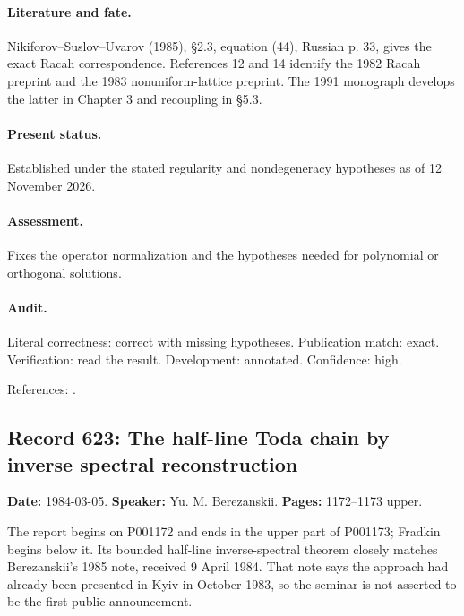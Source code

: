 \paragraph{Literature and fate.} Nikiforov–Suslov–Uvarov (1985), \S2.3, equation (44), Russian p. 33, gives the exact Racah correspondence. References 12 and 14 identify the 1982 Racah preprint and the 1983 nonuniform-lattice preprint. The 1991 monograph develops the latter in Chapter 3 and recoupling in \S5.3.

\paragraph{Present status.} Established under the stated regularity and nondegeneracy hypotheses as of 12 November 2026.

\paragraph{Assessment.} Fixes the operator normalization and the hypotheses needed for polynomial or orthogonal solutions.

\paragraph{Audit.} Literal correctness: correct with missing hypotheses. Publication match: exact. Verification: read the result. Development: annotated. Confidence: high.

\noindent References: \citep{nikiforovsuslovuvarov1985rotation,nikiforovsuslovuvarov1991classical}.\par

\subsection{Record 623: The half-line Toda chain by inverse spectral reconstruction}

\label{talk:623}

\noindent\textbf{Date:} 1984-03-05. \textbf{Speaker:} Yu. M. Berezanskii. \textbf{Pages:} 1172--1173 upper.\par

The report begins on P001172 and ends in the upper part of P001173; Fradkin begins below it. Its bounded half-line inverse-spectral theorem closely matches Berezanskii’s 1985 note, received 9 April 1984. That note says the approach had already been presented in Kyiv in October 1983, so the seminar is not asserted to be the first public announcement.

